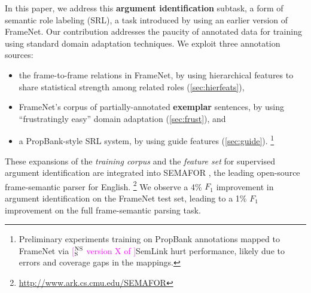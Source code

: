 \documentclass[11pt,a4paper]{article}
\newcommand{\ensuretext}[1]{#1}
\newcommand{\nssmarker}{\ensuretext{\textcolor{magenta}{\ensuremath{^{\textsc{NS}}_{\textsc{S}}}}}}
\newcommand{\nasmarker}{\ensuretext{\textcolor{blue}{\ensuremath{^{\textsc{NA}}_{\textsc{S}}}}}}
\newcommand{\arkcomment}[3]{\ensuretext{\textcolor{#3}{[#1 #2]}}}
\newcommand{\nss}[1]{\arkcomment{\nssmarker}{#1}{magenta}}
\newcommand{\nascomment}[1]{\arkcomment{\nasmarker}{#1}{blue}}
\newcommand{\finalversion}[1]{#1}
\begin{document}
In this paper, we address this \textbf{argument identification} 
subtask, a form of semantic role labeling (SRL), 
a task introduced by \citet{gildea-02} using an earlier version of FrameNet.
Our contribution addresses the paucity of annotated data for training 
using  standard domain
adaptation techniques.  We exploit three annotation sources:

\begin{itemize}
  \item the frame-to-frame relations in FrameNet, by using
  hierarchical features to share statistical strength among related roles
  (\cref{sec:hierfeats}),
  \item FrameNet's corpus of partially-annotated \textbf{exemplar} sentences,
  by using ``frustratingly easy'' domain adaptation (\cref{sec:frust}), and
  \item a PropBank-style SRL system, by using guide features (\cref{sec:guide}).%
\footnote{Preliminary experiments training on PropBank annotations mapped to 
FrameNet via \finalversion{\nss{version X of }}SemLink \citep{bonial-13} hurt performance, likely due to errors and coverage gaps in the mappings.}
\end{itemize}
These expansions of the \emph{training corpus} and the \emph{feature set}
for supervised argument identification  are integrated into SEMAFOR
\citep{das-14},  the leading open-source frame-semantic parser for English.%
\footnote{\url{http://www.ark.cs.cmu.edu/SEMAFOR}}
We observe a 4\% $F_1$ improvement in argument identification on the
FrameNet test set, leading to a 1\% $F_1$ improvement on the full
frame-semantic parsing task. 
\end{document}
